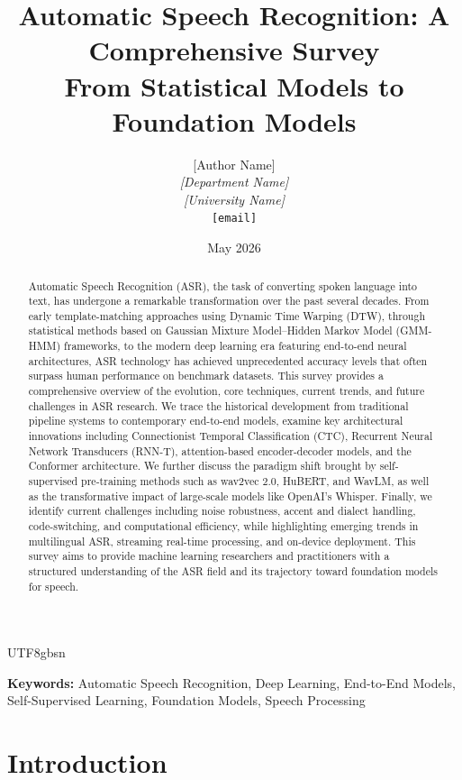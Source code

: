 \documentclass[12pt,a4paper]{article}
\title{
\textbf{Automatic Speech Recognition: A Comprehensive Survey} \\
\large{From Statistical Models to Foundation Models}
}
\author{
[Author Name] \\
\textit{[Department Name]} \\
\textit{[University Name]} \\
\texttt{[email]}
}
\date{May 2026}
\begin{document}
\begin{CJK}{UTF8}{gbsn}  %

\maketitle

\begin{abstract}
Automatic Speech Recognition (ASR), the task of converting spoken language into text, has undergone a remarkable transformation over the past several decades. From early template-matching approaches using Dynamic Time Warping (DTW), through statistical methods based on Gaussian Mixture Model--Hidden Markov Model (GMM-HMM) frameworks, to the modern deep learning era featuring end-to-end neural architectures, ASR technology has achieved unprecedented accuracy levels that often surpass human performance on benchmark datasets. This survey provides a comprehensive overview of the evolution, core techniques, current trends, and future challenges in ASR research. We trace the historical development from traditional pipeline systems to contemporary end-to-end models, examine key architectural innovations including Connectionist Temporal Classification (CTC), Recurrent Neural Network Transducers (RNN-T), attention-based encoder-decoder models, and the Conformer architecture. We further discuss the paradigm shift brought by self-supervised pre-training methods such as wav2vec 2.0, HuBERT, and WavLM, as well as the transformative impact of large-scale models like OpenAI's Whisper. Finally, we identify current challenges including noise robustness, accent and dialect handling, code-switching, and computational efficiency, while highlighting emerging trends in multilingual ASR, streaming real-time processing, and on-device deployment. This survey aims to provide machine learning researchers and practitioners with a structured understanding of the ASR field and its trajectory toward foundation models for speech.
\end{abstract}

\textbf{Keywords:} Automatic Speech Recognition, Deep Learning, End-to-End Models, Self-Supervised Learning, Foundation Models, Speech Processing

\newpage
\tableofcontents
\newpage

\section{Introduction}
\label{sec:intro}


\end{CJK}
\end{document}
